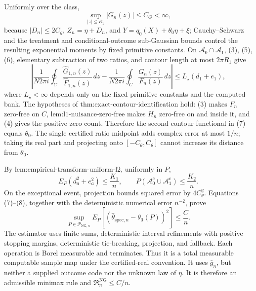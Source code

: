 Uniformly over the class,
\[
 \sup_{|z|\le R_1}|G_n(z)|\le C_G<\infty, \tag{6}
\]
because \(|D_n|\le2C_g\), \(Z_n=\eta+D_n\), and \(Y=q_0(X)+\theta_0\eta+\xi\); Cauchy--Schwarz and the treatment and conditional-outcome sub-Gaussian bounds control the resulting exponential moments by fixed primitive constants.  On \(\mathcal A_0\cap\mathcal A_1\), (3), (5), (6), elementary subtraction of two ratios, and contour length at most \(2\pi R_1\) give
\[
 \left|
 \frac{1}{N2\pi i}\oint_C
 \frac{\widehat G_{1,n}(z)}{\widehat F_{1,n}(z)}\,dz
 -
 \frac{1}{N2\pi i}\oint_C
 \frac{G_n(z)}{F_n(z)}\,dz
 \right|
 \le L_{\star}(d_1+e_1), \tag{7}
\]
where \(L_{\star}<\infty\) depends only on the fixed primitive constants and the computed bank.  The hypotheses of \(\text{thm:exact-contour-identification}\) hold: (3) makes \(F_n\) zero-free on \(C\), \(\text{lem:l1-nuisance-zero-free}\) makes \(H_n\) zero-free on and inside it, and (4) gives the positive zero count.  Therefore the second contour functional in (7) equals \(\theta_0\).  The single certified ratio midpoint adds complex error at most \(1/n\); taking its real part and projecting onto \([-C_{\theta},C_{\theta}]\) cannot increase its distance from \(\theta_0\).

By \(\text{lem:empirical-transform-uniform-l2}\), uniformly in \(P\),
\[
 E_P(d_a^2+e_a^2)\le\frac{K_1}{n},
 \qquad
 P(\mathcal A_0^c\cup\mathcal A_1^c)\le\frac{K_2}{n}. \tag{8}
\]
On the exceptional event, projection bounds squared error by \(4C_{\theta}^2\).  Equations (7)--(8), together with the deterministic numerical error \(n^{-2}\), prove
\[
 \sup_{P\in\mathcal P_{\mathrm{NG},n}}
 E_P[(\widehat\theta_{\mathrm{spec},n}-\theta_0(P))^2]
 \le\frac Cn. \tag{9}
\]
The estimator uses finite sums, deterministic interval refinements with positive stopping margins, deterministic tie-breaking, projection, and fallback.  Each operation is Borel measurable and terminates.  Thus it is a total measurable computable sample map under the certified-real convention.  It uses \(\bar g_n\), but neither a supplied outcome code nor the unknown law of \(\eta\).  It is therefore an admissible minimax rule and \(\mathfrak R_n^{\mathrm{NG}}\le C/n\).

